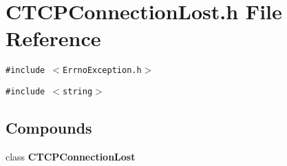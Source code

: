 \section{CTCPConnection\-Lost.h File Reference}
\label{CTCPConnectionLost_8h}
{\tt \#include $<$Errno\-Exception.h$>$}\par
{\tt \#include $<$string$>$}\par
\subsection*{Compounds}
\begin{CompactItemize}
\item 
class {\bf CTCPConnection\-Lost}
\end{CompactItemize}
